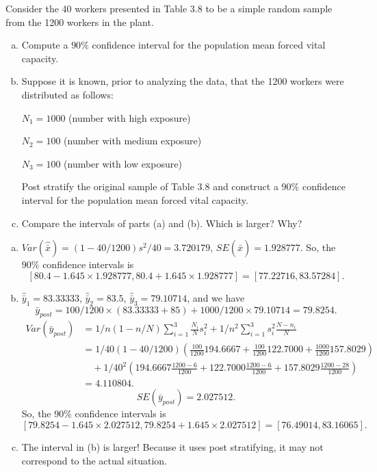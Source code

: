 \documentclass[12pt]{article}
\begin{document}
    \begin{exercise}[Levy-6.4]
        Consider the 40 workers presented in Table 3.8 to be a simple random sample from the 1200 workers in the plant. 
        \begin{enumerate}[a.]
            \item Compute a $90\%$ confidence interval for the population mean forced vital capacity. 
            \item Suppose it is known, prior to analyzing the data, that the 1200 workers were distributed as follows: 
            
            \qquad $N_1=1000$ (number with high exposure)

            \qquad $N_2=100$ (number with medium exposure)

            \qquad $N_3=100$ (number with low exposure)

            Post stratify the original sample of Table 3.8 and construct a $90\%$ confidence interval for the population mean forced vital capacity. 
            \item Compare the intervals of parts (a) and (b). Which is larger? Why? 
        \end{enumerate}
    \end{exercise}

    \begin{solution}
        \begin{enumerate}[a.]
            \item $Var(\hat{\bar{x}})=(1-40/1200)s^2/40=3.720179$, $SE(\hat{\bar{x}})=1.928777$. So, the $90\%$ confidence intervals is
            \[
                [80.4-1.645\times1.928777, 80.4+1.645\times1.928777]=[77.22716, 83.57284].
            \]
            \item $\hat{\bar{y}}_1=83.33333$, $\hat{\bar{y}}_2=83.5$, $\hat{\bar{y}}_3=79.10714$, and we have
            \[
                \bar{y}_{post}=100/1200\times(83.33333+85)+1000/1200\times79.10714=79.8254. 
            \]
            \[
                \begin{aligned}
                    Var(\bar{y}_{post})&= 1/n(1-n/N)\sum_{i=1}^3\frac{N_i}{N}s_i^2+1/n^2\sum_{i=1}^3s_i^2\frac{N-n_i}{N}\\
                    &=1/40(1-40/1200)\left(\frac{100}{1200}194.6667+\frac{100}{1200}122.7000+\frac{1000}{1200}157.8029\right)\\
                    &\quad+1/40^2\left(194.6667\frac{1200-6}{1200}+122.7000\frac{1200-6}{1200}+157.8029\frac{1200-28}{1200}\right)\\
                    &=4.110804. 
                \end{aligned}
            \]
            \[
                SE(\bar{y}_{post})=2.027512. 
            \]
            So, the $90\%$ confidence intervals is
            \[
                [79.8254-1.645\times2.027512, 79.8254+1.645\times2.027512]=[76.49014, 83.16065].
            \]
            \item The interval in (b) is larger! Because it uses post stratifying, it may not correspond to the actual situation. 
        \end{enumerate}
    \end{solution}


\end{document}
